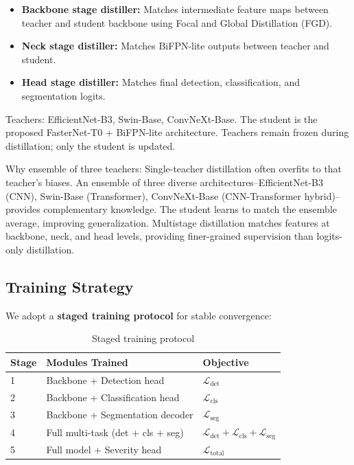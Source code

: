 \documentclass[10pt,a4paper,twocolumn]{article}
\begin{document}
\begin{itemize}
    \item \textbf{Backbone stage distiller:} Matches intermediate feature maps between teacher and student backbone using Focal and Global Distillation (FGD).
    \item \textbf{Neck stage distiller:} Matches BiFPN-lite outputs between teacher and student.
    \item \textbf{Head stage distiller:} Matches final detection, classification, and segmentation logits.
\end{itemize}

Teachers: EfficientNet-B3, Swin-Base, ConvNeXt-Base. The student is the proposed FasterNet-T0 + BiFPN-lite architecture. Teachers remain frozen during distillation; only the student is updated.

Why ensemble of three teachers: Single-teacher distillation often overfits to that teacher's biases. An ensemble of three diverse architectures--EfficientNet-B3 (CNN), Swin-Base (Transformer), ConvNeXt-Base (CNN-Transformer hybrid)--provides complementary knowledge. The student learns to match the ensemble average, improving generalization. Multistage distillation matches features at backbone, neck, and head levels, providing finer-grained supervision than logits-only distillation.

\subsection{Training Strategy}

We adopt a \textbf{staged training protocol} for stable convergence:

\begin{table}[htbp]
\centering
\caption{Staged training protocol}
\label{tab:training}
\begin{tabular}{p{}p{}p{}}
\toprule
\textbf{Stage} & \textbf{Modules Trained} & \textbf{Objective} \\
\midrule
1 & Backbone + Detection head & $\mathcal{L}_{\text{det}}$ \\
2 & Backbone + Classification head & $\mathcal{L}_{\text{cls}}$ \\
3 & Backbone + Segmentation decoder & $\mathcal{L}_{\text{seg}}$ \\
4 & Full multi-task (det + cls + seg) & $\mathcal{L}_{\text{det}}+\mathcal{L}_{\text{cls}}+\mathcal{L}_{\text{seg}}$ \\
5 & Full model + Severity head & $\mathcal{L}_{\text{total}}$ \\
\bottomrule
\end{tabular}
\end{table}
\end{document}
